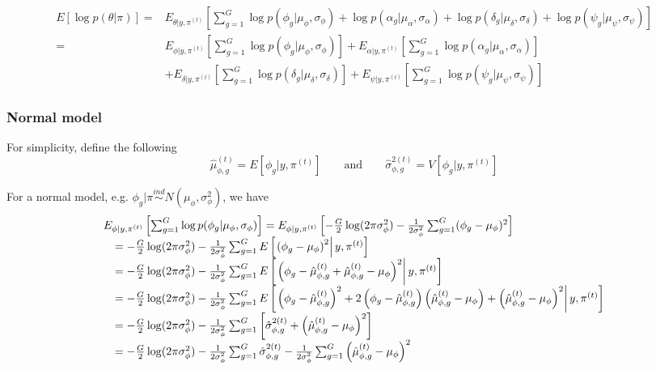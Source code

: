 \documentclass{article}
\begin{document}
\begin{align*}
E[\log p(\theta|\pi)]
=& E_{\theta|y,\pi^{(t)}} \left[ \sum_{g=1}^G \log p(\phi_g|\mu_\phi, \sigma_\phi) +\log p(\alpha_g|\mu_\alpha, \sigma_\alpha) +\log p(\delta_g|\mu_\delta, \sigma_\delta) +\log p(\psi_g|\mu_\psi, \sigma_\psi) \right] \\
=& E_{\phi|y,\pi^{(t)}} \left[ \sum_{g=1}^G \log p(\phi_g|\mu_\phi, \sigma_\phi) \right] +  E_{\alpha|y,\pi^{(t)}} \left[ \sum_{g=1}^G \log p(\alpha_g|\mu_\alpha, \sigma_\alpha) \right] \\
&+  E_{\delta|y,\pi^{(t)}} \left[ \sum_{g=1}^G \log p(\delta_g|\mu_\delta, \sigma_\delta) \right] +  E_{\psi|y,\pi^{(t)}} \left[ \sum_{g=1}^G \log p(\psi_g|\mu_\psi, \sigma_\psi) \right]
\end{align*}

\subsubsection{Normal model}

For simplicity, define the following 
\[
\hat{\mu}_{\phi,g}^{(t)} = E[\phi_g|y,\pi^{(t)}] \qquad \mbox{and} \qquad
\hat{\sigma}_{\phi,g}^{2(t)} = V[\phi_g|y,\pi^{(t)}] 
\]

For a normal model, e.g. $\phi_g|\pi \stackrel{ind}{\sim} N(\mu_\phi,\sigma_\phi^2)$, we have 
\[ 
\begin{array}{rl}
\multicolumn{2}{l}{
E_{\phi|y,\pi^{(t)}} \left[ \sum_{g=1}^G \log p(\phi_g|\mu_\phi, \sigma_\phi) \right] = 
E_{\phi|y,\pi^{(t)}} \left[ -\frac{G}{2}\log(2\pi \sigma_\phi^2) - \frac{1}{2\sigma_\phi^2} \sum_{g=1}^G (\phi_g-\mu_\phi)^2 \right]} \\
&= -\frac{G}{2}\log(2\pi \sigma_\phi^2) - \frac{1}{2\sigma_\phi^2} \sum_{g=1}^G E\left[\left.\left(\phi_g-\mu_\phi\right)^2\right|y,\pi^{(t)}\right]\\
&= -\frac{G}{2}\log(2\pi \sigma_\phi^2) - \frac{1}{2\sigma_\phi^2} \sum_{g=1}^G E\left[\left.\left(\phi_g-\hat{\mu}_{\phi,g}^{(t)}+\hat{\mu}_{\phi,g}^{(t)}-\mu_\phi\right)^2\right|y,\pi^{(t)}\right]\\
&= -\frac{G}{2}\log(2\pi \sigma_\phi^2) - \frac{1}{2\sigma_\phi^2} \sum_{g=1}^G 
E\left[\left.\left(\phi_g-\hat{\mu}_{\phi,g}^{(t)}\right)^2+2\left(\phi_g-\hat{\mu}_{\phi,g}^{(t)}\right)\left(\hat{\mu}_{\phi,g}^{(t)}-\mu_\phi\right)+\left(\hat{\mu}_{\phi,g}^{(t)}-\mu_\phi\right)^2\right|y,\pi^{(t)}\right]\\
&= -\frac{G}{2}\log(2\pi \sigma_\phi^2) - \frac{1}{2\sigma_\phi^2} \sum_{g=1}^G \left[ \hat{\sigma}_{\phi,g}^{2(t)} + \left(\hat{\mu}_{\phi,g}^{(t)}-\mu_\phi\right)^2 \right]\\
&= -\frac{G}{2}\log(2\pi \sigma_\phi^2) - \frac{1}{2\sigma_\phi^2} \sum_{g=1}^G \hat{\sigma}_{\phi,g}^{2(t)} - \frac{1}{2\sigma_\phi^2} \sum_{g=1}^G \left(\hat{\mu}_{\phi,g}^{(t)}-\mu_\phi\right)^2 
\end{array}
\]
\end{document}
